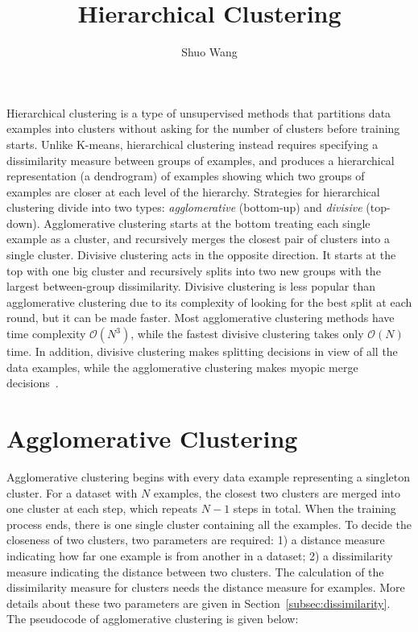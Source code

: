 \title{Hierarchical Clustering}
\label{chp:hierarchical-clustering}
\author{Shuo Wang}
\maketitle

Hierarchical clustering is a type of unsupervised methods that partitions data examples into clusters without asking for the number of clusters before training starts. Unlike K-means, hierarchical clustering instead requires specifying a dissimilarity measure between groups of examples, and produces a hierarchical representation (a dendrogram) of examples showing which two groups of examples are closer at each level of the hierarchy. Strategies for hierarchical clustering divide into two types: \textit{agglomerative} (bottom-up) and \textit{divisive} (top-down). Agglomerative clustering starts at the bottom treating each single example as a cluster, and recursively merges the closest pair of clusters into a single cluster. Divisive clustering acts in the opposite direction. It starts at the top with one big cluster and recursively splits into two new groups with the largest between-group dissimilarity. Divisive clustering is less popular than agglomerative clustering due to its complexity of looking for the best split at each round, but it can be made faster. Most agglomerative clustering methods have time complexity $\mathcal{O}(N^3)$, while the fastest divisive clustering takes only $\mathcal{O}(N)$ time. In addition, divisive clustering makes splitting decisions in view of all the data examples, while the agglomerative clustering makes myopic merge decisions~\cite{Murphy2012}. 

\section{Agglomerative Clustering}
\label{sec:agglo-cluster}


Agglomerative clustering begins with every data example representing a singleton cluster. For a dataset with $N$ examples, the closest two clusters are merged into one cluster at each step, which repeats $N-1$ steps in total. When the training process ends, there is one single cluster containing all the examples. To decide the closeness of two clusters, two parameters are required: 1) a distance measure indicating how far one example is from another in a dataset; 2) a dissimilarity measure indicating the distance between two clusters. The calculation of the dissimilarity measure for clusters needs the distance measure for examples. More details about these two parameters are given in Section~\ref{subsec:dissimilarity}. The pseudocode of agglomerative clustering is given below:


